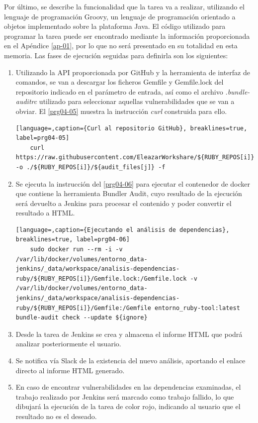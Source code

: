 Por último, se describe la funcionalidad que la tarea va a realizar, utilizando el lenguaje de programación Groovy, un lenguaje de programación orientado a objetos implementado sobre la plataforma Java. El código utilizado para programar la tarea puede ser encontrado mediante la información proporcionada en el Apéndice \ref{ap-01}, por lo que no será presentado en su totalidad en esta memoria. Las fases de ejecución seguidas para definirla son los siguientes:

\begin{enumerate}
	\item Utilizando la API proporcionada por GitHub y la herramienta de interfaz de comandos, se van a descargar los ficheros Gemfile y Gemfile.lock del repositorio indicado en el parámetro de entrada, así como el archivo \textit{.bundle-auditrc} utilizado para seleccionar aquellas vulnerabilidades que se van a obviar. El \autoref{prg04-05} muestra la instrucción \textit{curl} construida para ello. 
	\begin{lstlisting}[language=,caption={Curl al repositorio GitHub}, breaklines=true, label=prg04-05]
	curl https://raw.githubusercontent.com/EleazarWorkshare/${RUBY_REPOS[i]}/master/${audit_files[j]} -o ./${RUBY_REPOS[i]}/${audit_files[j]} -f
	\end{lstlisting}
	\item Se ejecuta la instrucción del \autoref{prg04-06} para ejecutar el contenedor de docker que contiene la herramienta Bundler Audit, cuyo resultado de la ejecución será devuelto a Jenkins para procesar el contenido y poder convertir el resultado a HTML.
	\begin{lstlisting}[language=,caption={Ejecutando el análisis de dependencias}, breaklines=true, label=prg04-06]
	sudo docker run --rm -i -v /var/lib/docker/volumes/entorno_data-jenkins/_data/workspace/analisis-dependencias-ruby/${RUBY_REPOS[i]}/Gemfile.lock:/Gemfile.lock -v /var/lib/docker/volumes/entorno_data-jenkins/_data/workspace/analisis-dependencias-ruby/${RUBY_REPOS[i]}/Gemfile:/Gemfile entorno_ruby-tool:latest bundle-audit check --update ${ignore}
	\end{lstlisting}
	\item Desde la tarea de Jenkins se crea y almacena el informe HTML que podrá analizar posteriormente el usuario.
	\item Se notifica vía Slack de la existencia del nuevo análisis, aportando el enlace directo al informe HTML generado.
	\item En caso de encontrar vulnerabilidades en las dependencias examinadas, el trabajo realizado por Jenkins será marcado como trabajo fallido, lo que dibujará la ejecución de la tarea de color rojo, indicando al usuario que el resultado no es el deseado. 
\end{enumerate}

